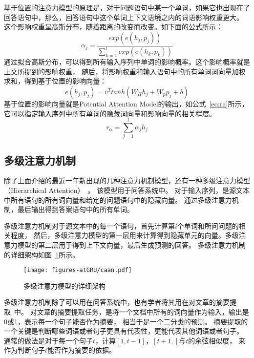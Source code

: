 基于位置的注意力模型的原理是，对于问题语句中某一个单词，如果它也出现在了回答语句中，那么，回答语句中这个单词上下文语境之内的词语影响权重更大。
这个影响权重呈高斯分布，随着距离的改变而改变。如下面的公式所示：
\begin{equation}
    \alpha _{j}=\frac{exp\left ( e\left ( h_{j},p_{j} \right ) \right )}{\sum_{k=1}^{l}exp\left ( e\left ( h_{k},p_{k} \right ) \right )}
\end{equation}
通过拟合高斯分布，可以得到所有输入序列中单词的影响概率。这个影响概率就是上文所提到的影响权重，
随后，将影响权重和输入语句中的所有单词词向量加权求和，得到基于位置的影响向量：
\begin{equation}
    e\left ( h_{j},p_{j} \right )=v^{T}tanh\left ( W_{H}h_{j}+W_{p}p_{j}+b \right )
\end{equation}
基于位置的影响向量就是Potential Attention Model的输出，如公式~\ref{eq:ra}所示，它可以指定输入序列中所有单词的隐藏词向量和影响向量的相关程度。
\begin{equation}
    r_{\alpha }=\sum_{j=1}^{l}\alpha _{j}h_{j}
    \label{eq:ra}
\end{equation}

\subsection{多级注意力机制}

除了上面介绍的最近一年新出现的几种注意力机制模型，还有一种多级注意力模型（Hierarchical Attention）~。
该模型用于问答系统中。
对于输入序列，是源文本中所有语句的所有词向量和给定的问题语句中的隐藏向量。
通过多级注意力机制，最后输出得到答案语句中的所有单词。

多级注意力机制对于源文本中的每一个语句，首先计算第${i}$个单词和所问问题的相关程度，
然后，多级注意力模型的第一层用来计算得到隐藏单元的向量。多级注意力模型的第二层用于得到上下文向量，最后生成预测的回答。
多级注意力机制的详细架构如图~\ref{fig:caan}所示。

\begin{figure}[h!]
    \centering
    \texttt{[image: figures-atGRU/caan.pdf]}
    \caption{多级注意力模型的详细架构}
    \label{fig:caan}
\end{figure}

多级注意力机制除了可以用在问答系统中，也有学者将其用在对文章的摘要提取~中。
对文章的摘要提取任务，是将一个文档中所有的词向量作为输入，输出是0或1，表示每一个句子能否作为摘要，
相当于是一个二分类的预测。
摘要提取的一个关键是判断哪些词语或者句子更具有代表性，更能代表其他词语或者句子。
通常的做法是对于每一个句子${t}$，计算${\left [ 1,t-1 \right ]}$，${\left [ t+1, \right ]}$与${t}$的余弦相似度，
来作为判断句子${t}$能否作为摘要的依据。

